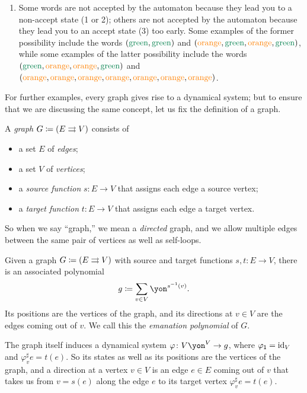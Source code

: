 \documentclass[Book-Poly]{subfiles}
\begin{document}
\begin{exercise}
\begin{solution}
\begin{enumerate}
    \item Some words are not accepted by the automaton because they lead you to a non-accept state (1 or 2); others are not accepted by the automaton because they lead you to an accept state (3) too early.
    Some examples of the former possibility include the words $({\color{dgreen}\text{green}},{\color{dgreen}\text{green}})$ and $({\color{orange}\text{orange}},{\color{dgreen}\text{green}},{\color{orange}\text{orange}},{\color{dgreen}\text{green}})$, while some examples of the latter possibility include the words $({\color{dgreen}\text{green}},{\color{orange}\text{orange}},{\color{orange}\text{orange}},{\color{dgreen}\text{green}})$ and $({\color{orange}\text{orange}},{\color{orange}\text{orange}},{\color{orange}\text{orange}},{\color{orange}\text{orange}},{\color{orange}\text{orange}},{\color{orange}\text{orange}},{\color{orange}\text{orange}})$.
\end{enumerate}
\end{solution}
\end{exercise}

For further examples, every graph gives rise to a dynamical system; but to ensure that we are discussing the same concept, let us fix the definition of a graph.

\begin{definition}[Graph] \label{def.graph}
A \emph{graph} $G \coloneqq (E \rightrightarrows V)$ consists of
\begin{itemize}
  \item a set $E$ of \emph{edges};
  \item a set $V$ of \emph{vertices};
  \item a \emph{source function} $s\colon E\to V$ that assigns each edge a source vertex;
  \item a \emph{target function} $t\colon E\to V$ that assigns each edge a target vertex.
\end{itemize}
\end{definition}

So when we say ``graph,'' we mean a \emph{directed} graph, and we allow multiple edges between the same pair of vertices as well as self-loops.

\begin{example} \label{ex.graph_dyn}
Given a graph $G\coloneqq(E\rightrightarrows V)$ with source and target functions $s,t\colon E\to V$, there is an associated polynomial
\[
    g\coloneqq\sum_{v \in V} \yon^{s\inv(v)}.
\]
Its positions are the vertices of the graph, and its directions at $v\in V$ are the edges coming out of $v$.
We call this the \emph{emanation polynomial} of $G$.


The graph itself induces a dynamical system $\varphi\colon V\yon^V\to g$, where $\varphi_{\textsf{1}} = \mathrm{id}_V$ and $\varphi^\sharp_v e = t(e)$.
So its states as well as its positions are the vertices of the graph, and a direction at a vertex $v\in V$ is an edge $e\in E$ coming out of $v$ that takes us from $v=s(e)$ along the edge $e$ to its target vertex $\varphi^\sharp_v e=t(e)$.
\end{example}
\end{document}
